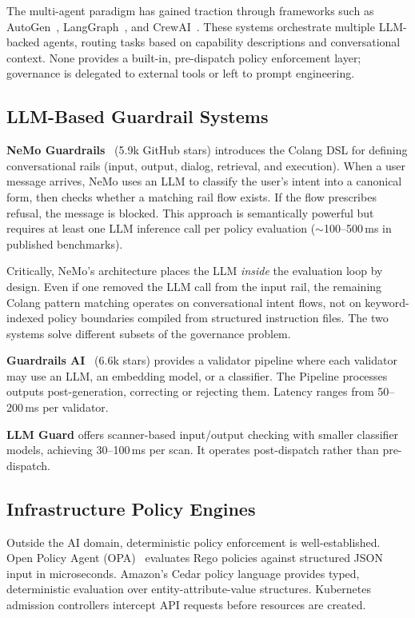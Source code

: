 \documentclass[11pt,a4paper]{article}
\begin{document}
The multi-agent paradigm has gained traction through frameworks such as
AutoGen~\cite{autogen2023}, LangGraph~\cite{langgraph2024}, and
CrewAI~\cite{crewai2024}. These systems orchestrate multiple LLM-backed
agents, routing tasks based on capability descriptions and conversational
context. None provides a built-in, pre-dispatch policy enforcement layer;
governance is delegated to external tools or left to prompt engineering.

\subsection{LLM-Based Guardrail Systems}

\textbf{NeMo Guardrails}~\cite{nemo2023} (5.9k GitHub stars) introduces
the Colang DSL for defining conversational rails (input, output, dialog,
retrieval, and execution). When a user message arrives, NeMo uses an LLM
to classify the user's intent into a canonical form, then checks whether
a matching rail flow exists. If the flow prescribes refusal, the message
is blocked. This approach is semantically powerful but requires at least
one LLM inference call per policy evaluation ($\sim$100--500\,ms in
published benchmarks).

Critically, NeMo's architecture places the LLM \emph{inside} the
evaluation loop by design. Even if one removed the LLM call from the
input rail, the remaining Colang pattern matching operates on
conversational intent flows, not on keyword-indexed policy boundaries
compiled from structured instruction files. The two systems solve
different subsets of the governance problem.

\textbf{Guardrails AI}~\cite{guardrailsai2023} (6.6k stars) provides a
validator pipeline where each validator may use an LLM, an embedding model,
or a classifier. The Pipeline processes outputs post-generation, correcting
or rejecting them. Latency ranges from 50--200\,ms per validator.

\textbf{LLM Guard} offers scanner-based input/output checking with smaller
classifier models, achieving 30--100\,ms per scan. It operates post-dispatch
rather than pre-dispatch.

\subsection{Infrastructure Policy Engines}

Outside the AI domain, deterministic policy enforcement is well-established.
Open Policy Agent (OPA)~\cite{opa2018} evaluates Rego policies against
structured JSON input in microseconds. Amazon's Cedar policy
language provides typed, deterministic evaluation over
entity-attribute-value structures. Kubernetes admission controllers
intercept API requests before resources are created.
\end{document}
